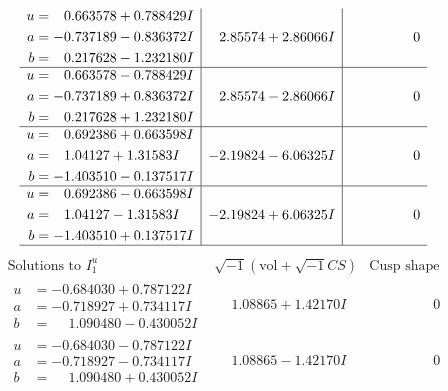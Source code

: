 \documentclass[1p]{elsarticle_modified}
\theoremstyle{definition}
\newcommand{\I}{\sqrt{-1}}
\begin{document}
$$\begin{array}{c|c|c}
\begin{aligned}
u &= \phantom{-}0.663578 + 0.788429 I \\
a &= -0.737189 - 0.836372 I \\
b &= \phantom{-}0.217628 - 1.232180 I\end{aligned}
 & \phantom{-}2.85574 + 2.86066 I & \phantom{-0.000000 } 0 \\ \hline\begin{aligned}
u &= \phantom{-}0.663578 - 0.788429 I \\
a &= -0.737189 + 0.836372 I \\
b &= \phantom{-}0.217628 + 1.232180 I\end{aligned}
 & \phantom{-}2.85574 - 2.86066 I & \phantom{-0.000000 } 0 \\ \hline\begin{aligned}
u &= \phantom{-}0.692386 + 0.663598 I \\
a &= \phantom{-}1.04127 + 1.31583 I \\
b &= -1.403510 - 0.137517 I\end{aligned}
 & -2.19824 - 6.06325 I & \phantom{-0.000000 } 0 \\ \hline\begin{aligned}
u &= \phantom{-}0.692386 - 0.663598 I \\
a &= \phantom{-}1.04127 - 1.31583 I \\
b &= -1.403510 + 0.137517 I\end{aligned}
 & -2.19824 + 6.06325 I & \phantom{-0.000000 } 0\\
 \hline 
 \end{array}$$\newpage$$\begin{array}{c|c|c}  
\text{Solutions to }I^u_{1}& \I (\text{vol} + \sqrt{-1}CS) & \text{Cusp shape}\\
 \hline 
\begin{aligned}
u &= -0.684030 + 0.787122 I \\
a &= -0.718927 + 0.734117 I \\
b &= \phantom{-}1.090480 - 0.430052 I\end{aligned}
 & \phantom{-}1.08865 + 1.42170 I & \phantom{-0.000000 } 0 \\ \hline\begin{aligned}
u &= -0.684030 - 0.787122 I \\
a &= -0.718927 - 0.734117 I \\
b &= \phantom{-}1.090480 + 0.430052 I\end{aligned}
 & \phantom{-}1.08865 - 1.42170 I & \phantom{-0.000000 } 0 \\ \hline\begin{aligned}

\end{aligned}
\end{array}$$
\end{document}
